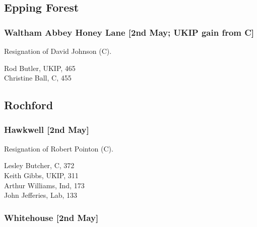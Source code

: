 \documentclass[a4paper,openany,10pt]{book}
\begin{document}
\subsection*{Epping Forest}

\subsubsection*{Waltham Abbey Honey Lane \hspace*{\fill}\nolinebreak[1]%
\enspace\hspace*{\fill}
[2nd May; UKIP gain from C]}


Resignation of David Johnson (C).



Rod Butler, UKIP, 465\\
Christine Ball, C, 455\\


\subsection*{Rochford}

\subsubsection*{Hawkwell \hspace*{\fill}\nolinebreak[1]%
\enspace\hspace*{\fill}
[2nd May]}


Resignation of Robert Pointon (C).



Lesley Butcher, C, 372\\
Keith Gibbs, UKIP, 311\\
Arthur Williams, Ind, 173\\
John Jefferies, Lab, 133\\


\subsubsection*{Whitehouse \hspace*{\fill}\nolinebreak[1]%
\enspace\hspace*{\fill}
[2nd May]}
\end{document}

